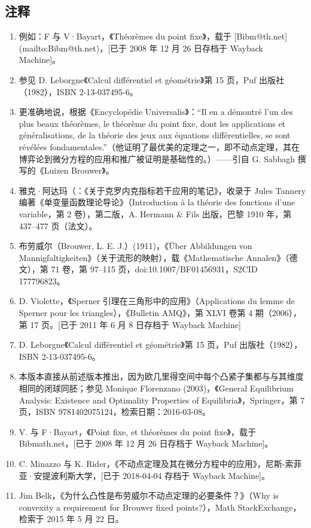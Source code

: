 \subsection{注释}
\begin{enumerate}
\item 例如：F 与 V·Bayart，《Théorèmes du point fixe》，载于 [Bibm@th.net](mailto:Bibm@th.net)，[已于 2008 年 12 月 26 日存档于 Wayback Machine]。
\item 参见 D. Leborgne《Calcul différentiel et géométrie》第 15 页，Puf 出版社（1982），ISBN 2-13-037495-6。
\item 更准确地说，根据《Encyclopédie Universalis》：“Il en a démontré l'un des plus beaux théorèmes, le théorème du point fixe, dont les applications et généralisations, de la théorie des jeux aux équations différentielles, se sont révélées fondamentales.”（他证明了最优美的定理之一，即不动点定理，其在博弈论到微分方程的应用和推广被证明是基础性的。）——引自 G. Sabbagh 撰写的《Luizen Brouwer》。
\item 雅克·阿达玛（：《关于克罗内克指标若干应用的笔记》，收录于 Jules Tannery 编著《单变量函数理论导论》（Introduction à la théorie des fonctions d'une variable，第 2 卷），第二版，A. Hermann & Fils 出版，巴黎 1910 年，第 437–477 页（法文）。
\item 布劳威尔（Brouwer, L. E. J.）(1911)，《Über Abbildungen von Mannigfaltigkeiten》（关于流形的映射），载《Mathematische Annalen》（德文），第 71 卷，第 97–115 页，doi:10.1007/BF01456931，S2CID 177796823。
\item D. Violette，《Sperner 引理在三角形中的应用》（Applications du lemme de Sperner pour les triangles），《Bulletin AMQ》，第 XLVI 卷第 4 期（2006），第 17 页。[已于 2011 年 6 月 8 日存档于 Wayback Machine]
\item D. Leborgne《Calcul différentiel et géométrie》第 15 页，Puf 出版社（1982），ISBN 2-13-037495-6。
\item 本版本直接从前述版本推出，因为欧几里得空间中每个凸紧子集都与与其维度相同的闭球同胚；参见 Monique Florenzano (2003)，《General Equilibrium Analysis: Existence and Optimality Properties of Equilibria》，Springer，第 7 页，ISBN 9781402075124，检索日期：2016-03-08。
\item V. 与 F·Bayart，《Point fixe, et théorèmes du point fixe》，载于 Bibmath.net，[已于 2008 年 12 月 26 日存档于 Wayback Machine]。
\item C. Minazzo 与 K. Rider，《不动点定理及其在微分方程中的应用》，尼斯-索菲亚·安提波利斯大学，[已于 2018-04-04 存档于 Wayback Machine]。
\item Jim Belk，《为什么凸性是布劳威尔不动点定理的必要条件？》（Why is convexity a requirement for Brouwer fixed points?），Math StackExchange，检索于 2015 年 5 月 22 日。

\end{enumerate}

